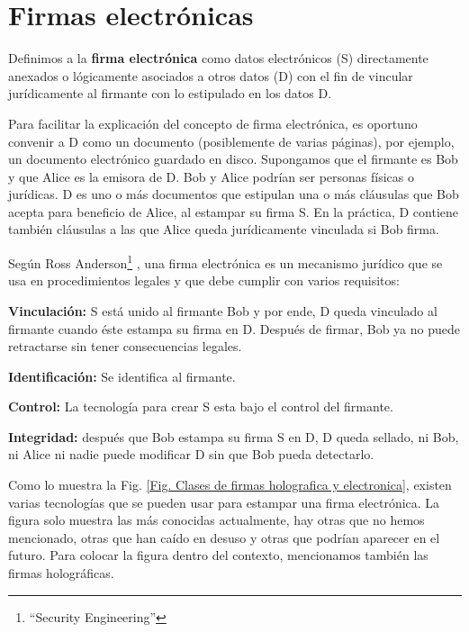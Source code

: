 \documentclass[12pt]{report} %
\begin{document}
\section{	Firmas electrónicas}

Definimos a la \textbf{firma electrónica} como datos electrónicos (S) directamente anexados o lógicamente asociados a otros datos (D) con el fin de vincular jurídicamente al firmante con lo estipulado en los datos D.

Para facilitar la explicación del concepto de firma electrónica, es oportuno convenir a D como un documento (posiblemente de varias páginas), por ejemplo, un documento electrónico guardado en disco. Supongamos que el firmante es Bob y que Alice es la emisora de D. Bob y Alice podrían ser personas físicas o jurídicas. D es uno o más documentos que estipulan una o más cláusulas que Bob acepta para beneficio de Alice, al estampar su firma S. En la práctica, D contiene también cláusulas a las que Alice queda jurídicamente vinculada si Bob firma.

Según Ross Anderson\footnote{\cite{Andersson2020}“Security Engineering”} , una firma electrónica es un mecanismo jurídico que se usa en procedimientos legales y que debe cumplir con varios requisitos:

\textbf{Vinculación:} S está unido al firmante Bob y por ende, D queda vinculado al firmante cuando éste estampa su firma en D. Después de firmar, Bob ya no puede retractarse sin tener consecuencias legales.

\textbf{Identificación:} Se identifica al firmante.

\textbf{Control:} La tecnología para crear S esta bajo el control del firmante.

\textbf{Integridad:} después que Bob estampa su firma S en D, D queda sellado, ni Bob, ni Alice ni nadie puede modificar D sin que Bob pueda detectarlo.
 	
Como lo muestra la Fig. \ref{Fig. Clases de firmas holografica y electronica}, existen varias tecnologías que se pueden usar para estampar una firma electrónica. La figura solo muestra las más conocidas actualmente, hay otras que no hemos mencionado, otras que han caído en desuso y otras que podrían aparecer en el futuro. Para colocar la figura dentro del contexto, mencionamos también las firmas holográficas.
\end{document}
